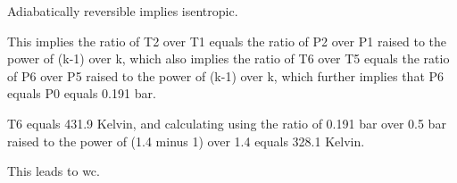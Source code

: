 Adiabatically reversible implies isentropic.

This implies the ratio of T2 over T1 equals the ratio of P2 over P1 raised to the power of (k-1) over k, which also implies the ratio of T6 over T5 equals the ratio of P6 over P5 raised to the power of (k-1) over k, which further implies that P6 equals P0 equals 0.191 bar.

T6 equals 431.9 Kelvin, and calculating using the ratio of 0.191 bar over 0.5 bar raised to the power of (1.4 minus 1) over 1.4 equals 328.1 Kelvin.

This leads to wc.